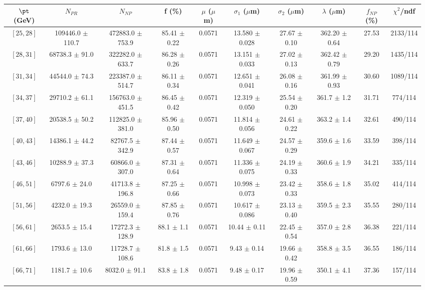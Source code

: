 \begin{tabular}{c||c|c|c|c|c|c|c||c|c}
$\pt$ (GeV) & $N_{PR}$ & $N_{NP}$ & f (\%) & $\mu$ ($\mu$m) & $\sigma_1$ ($\mu$m) & $\sigma_2$ ($\mu$m)  & $\lambda$ ($\mu$m) & $f_{NP}$ (\%) & $\chi^2$/ndf \\
\hline
$[25, 28]$ & 109446.0 $\pm$ 110.7 & 472883.0 $\pm$ 753.9 & 85.41 $\pm$ 0.22 & 0.0571 & 13.580 $\pm$ 0.028 & 27.67 $\pm$ 0.10 & 362.20 $\pm$ 0.64 & 27.53 & 2133/114\\
$[28, 31]$ & 68738.3 $\pm$ 91.0 & 322282.0 $\pm$ 633.7 & 86.28 $\pm$ 0.26 & 0.0571 & 13.151 $\pm$ 0.033 & 27.02 $\pm$ 0.13 & 362.42 $\pm$ 0.79 & 29.20 & 1435/114\\
$[31, 34]$ & 44544.0 $\pm$ 74.3 & 223387.0 $\pm$ 514.7 & 86.11 $\pm$ 0.34 & 0.0571 & 12.651 $\pm$ 0.041 & 26.08 $\pm$ 0.16 & 361.99 $\pm$ 0.93 & 30.60 & 1089/114\\
$[34, 37]$ & 29710.2 $\pm$ 61.1 & 156763.0 $\pm$ 451.5 & 86.45 $\pm$ 0.42 & 0.0571 & 12.319 $\pm$ 0.050 & 25.54 $\pm$ 0.20 & 361.7 $\pm$ 1.2 & 31.71 & 774/114\\
$[37, 40]$ & 20538.5 $\pm$ 50.2 & 112825.0 $\pm$ 381.0 & 85.96 $\pm$ 0.50 & 0.0571 & 11.814 $\pm$ 0.056 & 24.61 $\pm$ 0.22 & 363.2 $\pm$ 1.4 & 32.61 & 490/114\\
$[40, 43]$ & 14386.1 $\pm$ 44.2 & 82767.5 $\pm$ 342.9 & 87.44 $\pm$ 0.57 & 0.0571 & 11.649 $\pm$ 0.067 & 24.57 $\pm$ 0.29 & 359.6 $\pm$ 1.6 & 33.59 & 398/114\\
$[43, 46]$ & 10288.9 $\pm$ 37.3 & 60866.0 $\pm$ 307.0 & 87.31 $\pm$ 0.64 & 0.0571 & 11.336 $\pm$ 0.075 & 24.19 $\pm$ 0.33 & 360.6 $\pm$ 1.9 & 34.21 & 335/114\\
$[46, 51]$ & 6797.6 $\pm$ 24.0 & 41713.8 $\pm$ 196.8 & 87.25 $\pm$ 0.66 & 0.0571 & 10.998 $\pm$ 0.073 & 23.42 $\pm$ 0.33 & 358.6 $\pm$ 1.8 & 35.02 & 414/114\\
$[51, 56]$ & 4232.0 $\pm$ 19.3 & 26559.0 $\pm$ 159.4 & 87.85 $\pm$ 0.76 & 0.0571 & 10.617 $\pm$ 0.086 & 23.13 $\pm$ 0.40 & 359.5 $\pm$ 2.3 & 35.55 & 280/114\\
$[56, 61]$ & 2653.5 $\pm$ 15.4 & 17272.3 $\pm$ 128.9 & 88.1 $\pm$ 1.1 & 0.0571 & 10.44 $\pm$ 0.11 & 22.45 $\pm$ 0.54 & 357.0 $\pm$ 2.8 & 36.38 & 221/114\\
$[61, 66]$ & 1793.6 $\pm$ 13.0 & 11728.7 $\pm$ 108.6 & 81.8 $\pm$ 1.5 & 0.0571 & 9.43 $\pm$ 0.14 & 19.66 $\pm$ 0.42 & 358.8 $\pm$ 3.5 & 36.55 & 186/114\\
$[66, 71]$ & 1181.7 $\pm$ 10.6 & 8032.0 $\pm$ 91.1 & 83.8 $\pm$ 1.8 & 0.0571 & 9.48 $\pm$ 0.17 & 19.96 $\pm$ 0.59 & 350.1 $\pm$ 4.1 & 37.36 & 157/114\\

\end{tabular}
